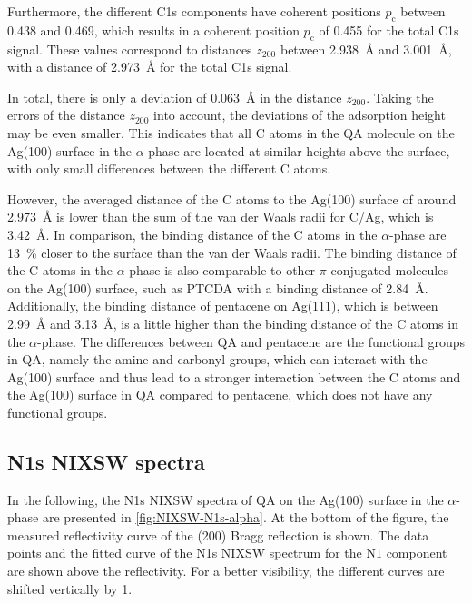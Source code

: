 Furthermore, the different C1s components have coherent positions $p_\mathrm{c}$ between 0.438 and 0.469, which results in a coherent position $p_\mathrm{c}$ of 0.455 for the total C1s signal. These values correspond to distances $z_{200}$ between 2.938~\si{\angstrom} and 3.001~\si{\angstrom}, with a distance of 2.973~\si{\angstrom} for the total C1s signal. 

In total, there is only a deviation of 0.063~\si{\angstrom} in the distance $z_{200}$. Taking the errors of the distance $z_{200}$ into account, the deviations of the adsorption height may be even smaller. This indicates that all C atoms in the \ac{QA} molecule on the Ag(100) surface in the $\alpha$-phase are located at similar heights above the surface, with only small differences between the different C atoms. 

However, the averaged distance of the C atoms to the Ag(100) surface of around 2.973~\si{\angstrom} is lower than the sum of the van der Waals radii for C/Ag, which is 3.42~\si{\angstrom}.\autocite{Bondi1964} In comparison, the binding distance of the C atoms in the $\alpha$-phase are 13~\% closer to the surface than the van der Waals radii. The binding distance of the C atoms in the $\alpha$-phase is also comparable to other $\pi$-conjugated molecules on the Ag(100) surface, such as \ac{PTCDA} with a binding distance of 2.84~\si{\angstrom}.\autocite{Bauer2014} Additionally, the binding distance of pentacene on Ag(111), which is between 2.99~\si{\angstrom} and 3.13~\si{\angstrom},\autocite{Burker2014} is a little higher than the binding distance of the C atoms in the $\alpha$-phase. The differences between \ac{QA} and pentacene are the functional groups in \ac{QA}, namely the amine and carbonyl groups, which can interact with the Ag(100) surface and thus lead to a stronger interaction between the C atoms and the Ag(100) surface in \ac{QA} compared to pentacene, which does not have any functional groups.

\newpage 
\subsection{N1s NIXSW spectra}

In the following, the N1s \ac{NIXSW} spectra of \ac{QA} on the Ag(100) surface in the $\alpha$-phase are presented in \autoref{fig:NIXSW-N1s-alpha}. At the bottom of the figure, the measured reflectivity curve of the (200) Bragg reflection is shown. The data points and the fitted curve of the N1s \ac{NIXSW} spectrum for the $\mathrm{N1}$ component are shown above the reflectivity. For a better visibility, the different curves are shifted vertically by 1.

